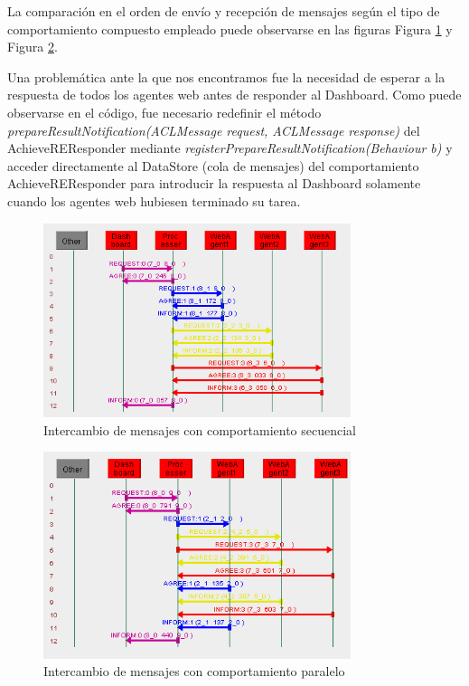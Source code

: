 \documentclass{estilo}
\begin{document}
    La comparación en el orden de envío y recepción de mensajes según el tipo de comportamiento compuesto empleado puede observarse en las figuras Figura \ref{fig:fig7} y Figura \ref{fig:fig8}.
    
    Una problemática ante la que nos encontramos fue la necesidad de esperar a la respuesta de todos los agentes web antes de responder al Dashboard. Como puede observarse en el código, fue necesario redefinir el método \textit{prepareResultNotification(ACLMessage request, ACLMessage response)} del AchieveREResponder mediante \textit{registerPrepareResultNotification(Behaviour b)} y acceder directamente al DataStore (cola de mensajes) del comportamiento AchieveREResponder para introducir la respuesta al Dashboard solamente cuando los agentes web hubiesen terminado su tarea.
    
    \vfill
    \begin{figure} [ht]
        \centering
        \includegraphics[width=9cm]{images/sniffer_capture_sequential.PNG}
        \caption{Intercambio de mensajes con comportamiento secuencial}
        \label{fig:fig7}
    \end{figure}
    \vfill
    
    \vfill
    \begin{figure} [ht]
        \centering
        \includegraphics[width=9cm]{images/sniffer_capture_parallel.PNG}
        \caption{Intercambio de mensajes con comportamiento paralelo}
        \label{fig:fig8}
    \end{figure}
    \vfill
    
\end{document}

